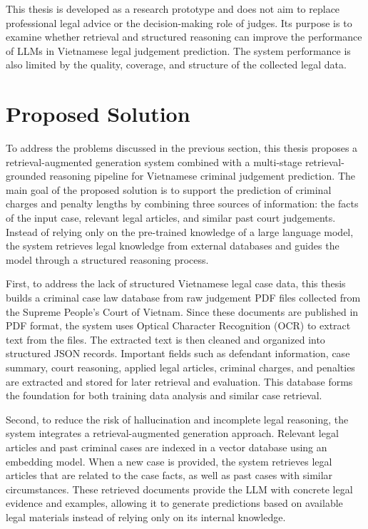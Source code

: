 \documentclass[../main.tex]{subfiles}
\begin{document}
This thesis is developed as a research prototype and does not aim to replace professional legal advice or the decision-making role of judges. Its purpose is to examine whether retrieval and structured reasoning can improve the performance of LLMs in Vietnamese legal judgement prediction. The system performance is also limited by the quality, coverage, and structure of the collected legal data.

\section{Proposed Solution}
To address the problems discussed in the previous section, this thesis proposes a retrieval-augmented generation system combined with a multi-stage retrieval-grounded reasoning pipeline for Vietnamese criminal judgement prediction. The main goal of the proposed solution is to support the prediction of criminal charges and penalty lengths by combining three sources of information: the facts of the input case, relevant legal articles, and similar past court judgements. Instead of relying only on the pre-trained knowledge of a large language model, the system retrieves legal knowledge from external databases and guides the model through a structured reasoning process.

First, to address the lack of structured Vietnamese legal case data, this thesis builds a criminal case law database from raw judgement PDF files collected from the Supreme People's Court of Vietnam. Since these documents are published in PDF format, the system uses Optical Character Recognition (OCR) to extract text from the files. The extracted text is then cleaned and organized into structured JSON records. Important fields such as defendant information, case summary, court reasoning, applied legal articles, criminal charges, and penalties are extracted and stored for later retrieval and evaluation. This database forms the foundation for both training data analysis and similar case retrieval.

Second, to reduce the risk of hallucination and incomplete legal reasoning, the system integrates a retrieval-augmented generation approach. Relevant legal articles and past criminal cases are indexed in a vector database using an embedding model. When a new case is provided, the system retrieves legal articles that are related to the case facts, as well as past cases with similar circumstances. These retrieved documents provide the LLM with concrete legal evidence and examples, allowing it to generate predictions based on available legal materials instead of relying only on its internal knowledge.
\end{document}
